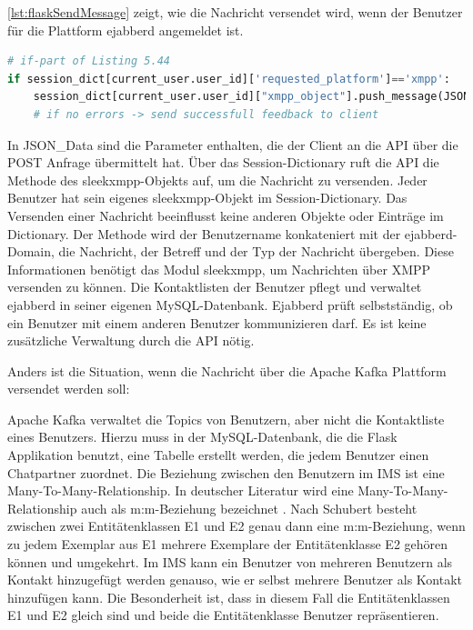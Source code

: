 \documentclass[a4paper,titlepage,halfparskip,12pt]{scrreprt}
\begin{document}
\begin{onehalfspacing}
\autoref{lst:flaskSendMessage} zeigt, wie die Nachricht versendet wird, wenn der Benutzer für die Plattform ejabberd angemeldet ist.
\begin{lstlisting}[language=python, caption={Code für den Versand einer Nachricht über die \acs{API} an ejabberd}, label={lst:flaskSendMessage}]
# if-part of Listing 5.44
if session_dict[current_user.user_id]['requested_platform']=='xmpp':
    session_dict[current_user.user_id]["xmpp_object"].push_message(JSON_Data["to"]+"@ejabberd-server", JSON_Data["msg_body"], JSON_Data["msg_subject"], JSON_Data["msg_type"])
    # if no errors -> send successfull feedback to client
\end{lstlisting}


In {JSON\_Data} sind die Parameter enthalten, die der Client an die \acs{API} über die POST Anfrage übermittelt hat.
Über das Session-Dictionary ruft die \acs{API} die Methode des sleekxmpp-Objekts auf, um die Nachricht zu versenden. Jeder Benutzer hat sein eigenes sleekxmpp-Objekt im Session-Dictionary. Das Versenden einer Nachricht beeinflusst keine anderen Objekte oder Einträge im Dictionary. Der Methode wird der Benutzername konkateniert mit der ejabberd-Domain, die Nachricht, der Betreff und der Typ der Nachricht übergeben. Diese Informationen benötigt das Modul sleekxmpp, um Nachrichten über \acs{XMPP} versenden zu können. Die Kontaktlisten der Benutzer pflegt und verwaltet ejabberd in seiner eigenen MySQL-Datenbank. Ejabberd prüft selbstständig, ob ein Benutzer mit einem anderen Benutzer kommunizieren darf. Es ist keine zusätzliche Verwaltung durch die \acs{API} nötig.

Anders ist die Situation, wenn die Nachricht über die Apache Kafka Plattform versendet werden soll:

Apache Kafka verwaltet die Topics von Benutzern, aber nicht die Kontaktliste eines Benutzers. Hierzu muss in der MySQL-Datenbank, die die Flask Applikation benutzt, eine Tabelle erstellt werden, die jedem Benutzer einen Chatpartner zuordnet. Die Beziehung zwischen den Benutzern im \acs{IMS} ist eine Many-To-Many-Relationship. In deutscher Literatur wird eine Many-To-Many-Relationship auch als m:m-Beziehung bezeichnet \cite{Schubert2007}. Nach Schubert \cite{Schubert2007} besteht zwischen zwei Entitätenklassen E1 und E2 genau dann eine m:m-Beziehung, wenn zu jedem Exemplar aus E1 mehrere Exemplare der Entitätenklasse E2 gehören können und umgekehrt. Im \acs{IMS} kann ein Benutzer von mehreren Benutzern als Kontakt hinzugefügt werden genauso, wie er selbst mehrere Benutzer als Kontakt hinzufügen kann. Die Besonderheit ist, dass in diesem Fall die Entitätenklassen E1 und E2 gleich sind und beide die Entitätenklasse Benutzer repräsentieren.


\end{onehalfspacing}
\end{document}
